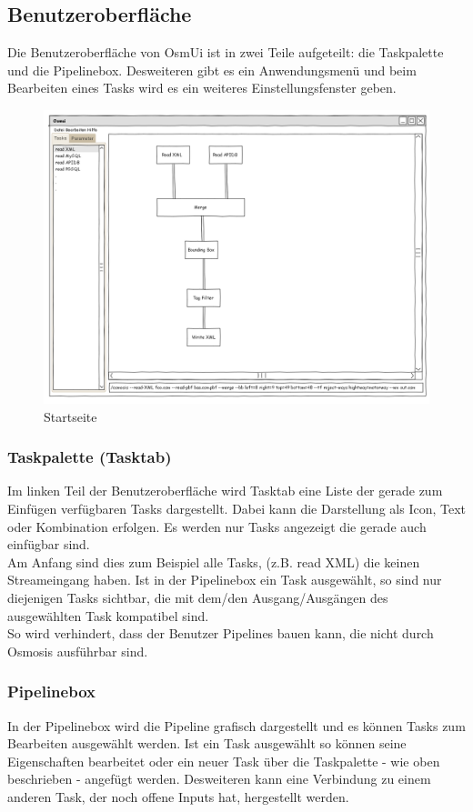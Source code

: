 \documentclass[a4paper,12pt]{scrartcl}
\begin{document}
\subsection{Benutzeroberfläche}
Die Benutzeroberfläche von OsmUi ist in zwei Teile aufgeteilt: die Taskpalette und die Pipelinebox. Desweiteren gibt es ein Anwendungsmenü und beim Bearbeiten eines Tasks
wird es ein weiteres Einstellungsfenster geben.\\
\begin{center}
\begin{figure}[h!]
\includegraphics[width=15cm]{ui_prototype/OsmUi_Startseite.png}
\caption{Startseite}
\end{figure}
\end{center}
\subsubsection{Taskpalette (Tasktab)}
Im linken Teil der Benutzeroberfläche wird Tasktab eine Liste der gerade zum Einfügen verfügbaren Tasks dargestellt. Dabei kann die Darstellung als Icon,
Text oder Kombination erfolgen. Es werden nur Tasks angezeigt die gerade auch einfügbar sind. \\
Am Anfang sind dies zum Beispiel alle Tasks, (z.B. read XML) die keinen Streameingang haben. Ist in der Pipelinebox ein Task ausgewählt, so
sind nur diejenigen Tasks sichtbar, die mit dem/den Ausgang/Ausgängen des ausgewählten Task kompatibel sind.\\
So wird verhindert, dass der Benutzer Pipelines bauen kann, die nicht durch Osmosis ausführbar sind.
\subsubsection{Pipelinebox}
In der Pipelinebox wird die Pipeline grafisch dargestellt und es können Tasks zum Bearbeiten ausgewählt werden. Ist ein Task ausgewählt so können seine Eigenschaften
bearbeitet oder ein neuer Task über die Taskpalette - wie oben beschrieben - angefügt werden. Desweiteren kann eine Verbindung zu einem anderen Task, der noch offene
Inputs hat, hergestellt werden.
\end{document}
